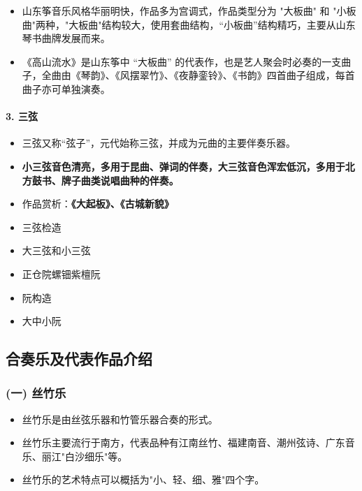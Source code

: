 \documentclass[
]{article}
\providecommand{\tightlist}{%
  \setlength{\itemsep}{0pt}\setlength{\parskip}{0pt}}
\begin{document}
\begin{itemize}
\tightlist
\item
  山东筝音乐风格华丽明快，作品多为宫调式，作品类型分为 "大板曲" 和
  "小板曲"两种，"大板曲"结构较大，使用套曲结构，``小板曲''结构精巧，主要从山东琴书曲牌发展而来。
\item
  《高山流水》是山东筝中 ``大板曲''
  的代表作，也是艺人聚会时必奏的一支曲子，全曲由《琴韵》、《风摆翠竹》、《夜静銮铃》、《书韵》四首曲子组成，每首曲子亦可单独演奏。
\end{itemize}

\paragraph{3. 三弦}\label{ux4e09ux5f26}

\begin{itemize}
\tightlist
\item
  三弦又称``弦子''，元代始称三弦，并成为元曲的主要伴奏乐器。
\item
  \textbf{小三弦音色清亮，多用于昆曲、弹词的伴奏，大三弦音色浑宏低沉，多用于北方鼓书、牌子曲类说唱曲种的伴奏。}
\item
  作品赏析：\textbf{《大起板》、《古城新貌》}
\item
  三弦检造
\item
  大三弦和小三弦
\item
  正仓院螺钿紫檀阮
\item
  阮构造
\item
  大中小阮
\end{itemize}

\subsection{合奏乐及代表作品介绍}\label{ux5408ux594fux4e50ux53caux4ee3ux8868ux4f5cux54c1ux4ecbux7ecd}

\subsubsection{(一) 丝竹乐}\label{ux4e00-ux4e1dux7af9ux4e50}

\begin{itemize}
\tightlist
\item
  丝竹乐是由丝弦乐器和竹管乐器合奏的形式。
\item
  丝竹乐主要流行于南方，代表品种有江南丝竹、福建南音、潮州弦诗、广东音乐、丽江"白沙细乐"等。
\item
  丝竹乐的艺术特点可以概括为"小、轻、细、雅"四个字。
\end{itemize}
\end{document}
